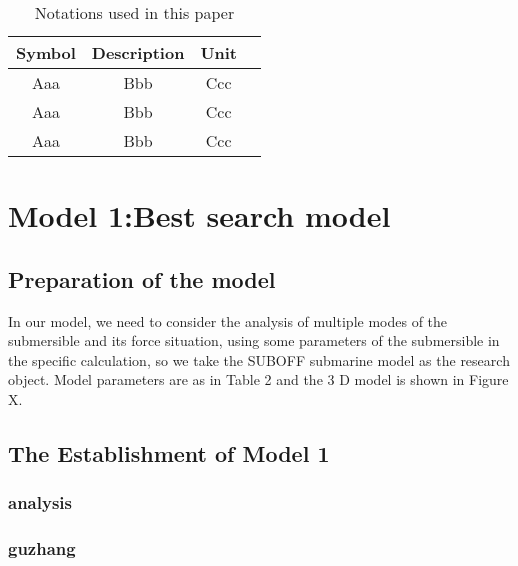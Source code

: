 \documentclass{mcmthesis}  %
\begin{document}
\begin{table}[h]  %
\caption{Notations used in this paper}  %
\label{tab1}  %
\tabcolsep 58pt %
\begin{tabular*}{\textwidth}{cccc}  %
\toprule  %
Symbol & Description & Unit  \\
\midrule  %
Aaa & Bbb & Ccc \\
Aaa & Bbb & Ccc  \\
Aaa & Bbb & Ccc \\
\bottomrule  %
\end{tabular*}  %
\end{table}  %

\section{Model 1:Best search model  }%
 





\subsection{Preparation of the model}  %
In our model, we need to consider the analysis of multiple modes of the submersible and its force situation, using some parameters of the submersible in the specific calculation, so we take the SUBOFF submarine model as the research object. Model parameters are as in Table 2 and the 3 D model is shown in Figure X.
\subsection{The Establishment of Model 1}
\subsubsection{analysis}
\subsubsection{guzhang}
\end{document}
